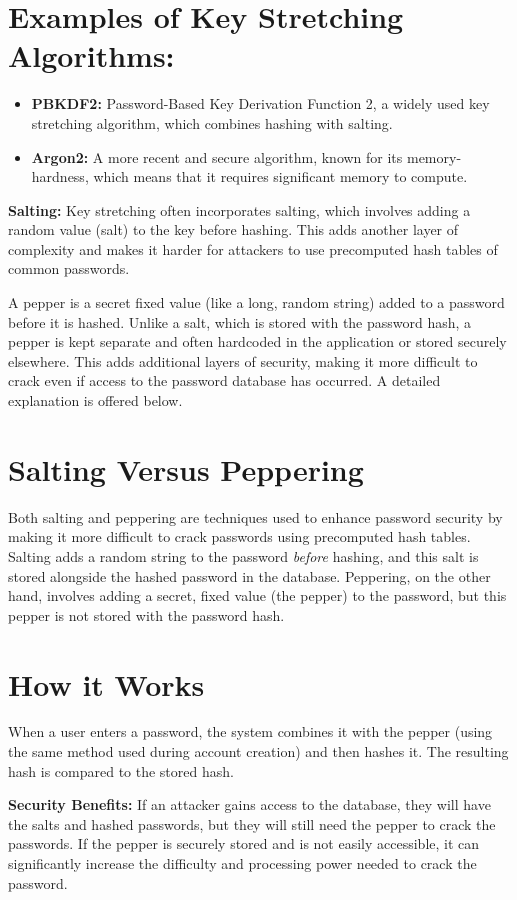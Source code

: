\section{Examples of Key Stretching Algorithms:}
\begin{itemize}
    \item \textbf{PBKDF2:} Password-Based Key Derivation Function 2, a widely used key stretching algorithm, which combines hashing with salting.
    \item \textbf{Argon2:} A more recent and secure algorithm, known for its memory-hardness, which means that it requires significant memory to compute.
\end{itemize}
\textbf{Salting:} Key stretching often incorporates salting, which involves adding a random value (salt) to the key before hashing. This adds another layer of complexity and makes it harder for attackers to use precomputed hash tables of common passwords.

 A pepper is a secret fixed value (like a long, random string) added to a password before it is hashed. Unlike a salt, which is stored with the password hash, a pepper is kept separate and often hardcoded in the application or stored securely elsewhere. This adds additional layers of security, making it more difficult to crack even if access to the password database has occurred. A detailed explanation is offered below.

\section{Salting Versus Peppering}
Both salting and peppering are techniques used to enhance password security by making it more difficult to crack passwords using precomputed hash tables. Salting adds a random string to the password \textit{before} hashing, and this salt is stored alongside the hashed password in the database. Peppering, on the other hand, involves adding a secret, fixed value (the pepper) to the password, but this pepper is not stored with the password hash.

\section{How it Works}
When a user enters a password, the system combines it with the pepper (using the same method used during account creation) and then hashes it. The resulting hash is compared to the stored hash.

\textbf{Security Benefits:} If an attacker gains access to the database, they will have the salts and hashed passwords, but they will still need the pepper to crack the passwords. If the pepper is securely stored and is not easily accessible, it can significantly increase the difficulty and processing power needed to crack the password.

